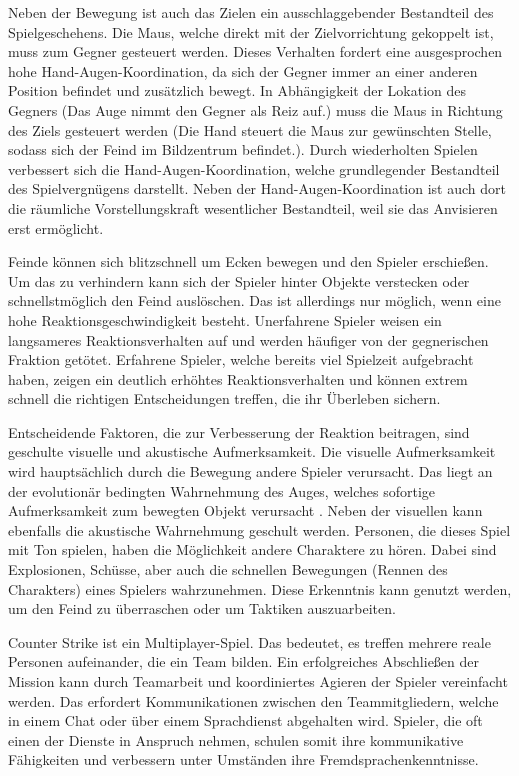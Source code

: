 Neben der Bewegung ist auch das Zielen ein ausschlaggebender Bestandteil des Spielgeschehens. Die Maus, welche direkt mit der Zielvorrichtung gekoppelt ist, muss zum Gegner gesteuert werden. Dieses Verhalten fordert eine ausgesprochen hohe Hand-Augen-Koordination, da sich der Gegner immer an einer anderen Position befindet und zusätzlich bewegt. In Abhängigkeit der Lokation des Gegners (Das Auge nimmt den Gegner als Reiz auf.) muss die Maus in Richtung des Ziels gesteuert werden (Die Hand steuert die Maus zur gewünschten Stelle, sodass sich der Feind im Bildzentrum befindet.). Durch wiederholten Spielen verbessert sich die Hand-Augen-Koordination, welche grundlegender Bestandteil des Spielvergnügens darstellt.\cite{mathias2014} Neben der Hand-Augen-Koordination ist auch dort die räumliche Vorstellungskraft wesentlicher Bestandteil, weil sie das Anvisieren erst ermöglicht. 

Feinde können sich blitzschnell um Ecken bewegen und den Spieler erschießen. Um das zu verhindern kann sich der Spieler hinter Objekte verstecken oder schnellstmöglich den Feind auslöschen. Das ist allerdings nur möglich, wenn eine hohe Reaktionsgeschwindigkeit besteht. Unerfahrene Spieler weisen ein langsameres Reaktionsverhalten auf \cite{jankloft2013} und werden häufiger von der gegnerischen Fraktion getötet. Erfahrene Spieler, welche bereits viel Spielzeit aufgebracht haben, zeigen ein deutlich erhöhtes Reaktionsverhalten\cite{stern.de2010} und können extrem schnell die richtigen Entscheidungen treffen, die ihr Überleben sichern\cite{samiskalli2010}\cite{cib/dapd2010}.

Entscheidende Faktoren, die zur Verbesserung der Reaktion beitragen, sind geschulte visuelle und akustische Aufmerksamkeit. Die visuelle Aufmerksamkeit wird hauptsächlich durch die Bewegung andere Spieler verursacht. Das liegt an der evolutionär bedingten Wahrnehmung des Auges, welches sofortige Aufmerksamkeit zum bewegten Objekt verursacht \cite{juliagross2011}. Neben der visuellen kann ebenfalls die akustische Wahrnehmung geschult werden. Personen, die dieses Spiel mit Ton spielen, haben die Möglichkeit andere Charaktere zu hören. Dabei sind Explosionen, Schüsse, aber auch die schnellen Bewegungen (Rennen des Charakters) eines Spielers wahrzunehmen. Diese Erkenntnis kann genutzt werden, um den Feind zu überraschen oder um Taktiken auszuarbeiten.

Counter Strike ist ein Multiplayer-Spiel. Das bedeutet, es treffen mehrere reale Personen aufeinander, die ein Team bilden. Ein erfolgreiches Abschließen der Mission kann durch Teamarbeit und koordiniertes Agieren der Spieler vereinfacht werden. Das erfordert Kommunikationen zwischen den Teammitgliedern, welche in einem Chat oder über einem Sprachdienst abgehalten wird. Spieler, die oft einen der Dienste in Anspruch nehmen, schulen somit ihre kommunikative Fähigkeiten\cite{achimkleinundtimokucza2004} und verbessern unter Umständen ihre Fremdsprachenkenntnisse. \cite{thomaswagner2011}

